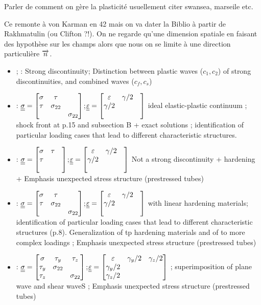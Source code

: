 Parler de comment on gère la plasticité usuellement citer swansea, marseile etc.

Ce remonte à von Karman en 42 mais on va dater la Biblio à partir de Rakhmatulin (ou Clifton ?!). On ne regarde qu'une dimension spatiale en faisant des hypothèse sur les champs alors que nous on se limite à une direction particulière ${\overrightarrow{n}}$.
\begin{itemize}
\item \cite{Rakhmatulin} ; \cite{CRISTESCU19591605} : Strong discontinuity; Distinction between plastic waves ($c_1,c_2$) of strong discontinuities, and combined waves ($c_f,c_s$)
\item \cite{Bleich}: ${\underline{\underline{\sigma}}}=\left[\begin{matrix}\sigma & \tau & \\ \tau & \sigma_{22} & \\ & & \sigma_{22}\end{matrix}\right]$;${\underline{\underline{\varepsilon}}}=\left[\begin{matrix}\varepsilon & \gamma/2 & \\ \gamma/2 &  & \\ & & \end{matrix}\right]$ ideal elastic-plastic continuum ; shock front at p.15 and subsection B + exact solutions ; identification of particular loading cases that lead to different characteristic structures.
\item \cite{Clifton}: ${\underline{\underline{\sigma}}}=\left[\begin{matrix}\sigma & \tau & \\ \tau & & \\ & & \end{matrix}\right]$;${\underline{\underline{\varepsilon}}}=\left[\begin{matrix}\varepsilon & \gamma/2 & \\ \gamma/2 &  & \\ & & \end{matrix}\right]$ Not a strong discontinuity + hardening + Emphasis unexpected stress structure (prestressed tubes)
\item \cite{Ting68}: ${\underline{\underline{\sigma}}}=\left[\begin{matrix}\sigma & \tau & \\ \tau & \sigma_{22} & \\ & & \sigma_{22}\end{matrix}\right]$;${\underline{\underline{\varepsilon}}}=\left[\begin{matrix}\varepsilon & \gamma/2 & \\ \gamma/2 &  & \\ & & \end{matrix}\right]$ with linear hardening materials; identification of particular loading cases that lead to different characteristic structures (p.8). Generalization of \cite{Bleich} tp hardening materials and of \cite{Clifton} to more complex loadings ; Emphasis unexpected stress structure (prestressed tubes)
\item \cite{Ting69}:  ${\underline{\underline{\sigma}}}=\left[\begin{matrix}\sigma & \tau_y & \tau_z\\ \tau_y & \sigma_{22} & \\\tau_z & & \sigma_{22}\end{matrix}\right]$;${\underline{\underline{\varepsilon}}}=\left[\begin{matrix}\varepsilon & \gamma_y/2 & \gamma_z/2\\ \gamma_y/2 &  & \\ \gamma_z/2& & \end{matrix}\right]$ ; superimposition of plane wave and shear waveS ; Emphasis unexpected stress structure (prestressed tubes)

\end{itemize}
